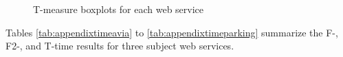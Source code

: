\documentclass[10pt,journal,cspaper,compsoc,onecolumn]{IEEEtran}
\begin{document}
\begin{figure}
	\centering
	\caption{T-measure boxplots for each web service}
	\label{fig:appendixTmeasure}
\end{figure}


Tables \ref{tab:appendixtimeavia} to \ref{tab:appendixtimeparking} summarize the F-, F2-, and T-time results for three subject web services.
\end{document}
